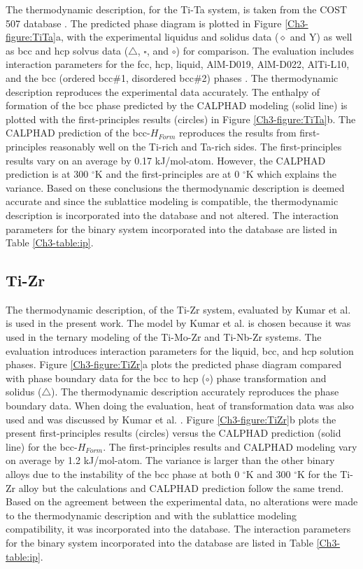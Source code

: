 The thermodynamic description, for the Ti-Ta system, is taken from the COST 507 database \cite{Ansara1998}. The predicted phase diagram is plotted in Figure \ref{Ch3-figure:TiTa}a, with the experimental liquidus and solidus data ($\diamond$ and Y) as well as bcc and hcp solvus data ($\bigtriangleup$, $\square$, and $\circ$) for comparison. The evaluation includes interaction parameters for the fcc, hcp, liquid, AlM-D019, AlM-D022, AlTi-L10, and the bcc (ordered bcc\#1, disordered bcc\#2) phases \cite{Murray1987}. The thermodynamic description reproduces the experimental data accurately. The enthalpy of formation of the bcc phase predicted by the CALPHAD modeling (solid line) is plotted with the first-principles results (circles) in Figure \ref{Ch3-figure:TiTa}b. The CALPHAD prediction of the bcc-$H_{Form}$ reproduces the results from first-principles reasonably well on the Ti-rich and Ta-rich sides. The first-principles results vary on an average by 0.17 kJ/mol-atom. However, the CALPHAD prediction is at 300 $^{\circ}$K and the first-principles are at 0 $^{\circ}$K which explains the variance. Based on these conclusions the thermodynamic description is deemed accurate and since the sublattice modeling is compatible, the thermodynamic description is incorporated into the database and not altered. The interaction parameters for the binary system incorporated into the database are listed in Table \ref{Ch3-table:ip}.

\subsection{Ti-Zr}

The thermodynamic description, of the Ti-Zr system, evaluated by Kumar et al. \cite{Kumar1994a} is used in the present work. The model by Kumar et al. is chosen because it was used in the ternary modeling of the Ti-Mo-Zr and Ti-Nb-Zr systems. The evaluation introduces interaction parameters for the liquid, bcc, and hcp solution phases. Figure \ref{Ch3-figure:TiZr}a plots the predicted phase diagram compared with phase boundary data for the bcc to hcp ($\circ$) phase transformation and solidus ($\bigtriangleup$). The thermodynamic description accurately reproduces the phase boundary data. When doing the evaluation, heat of transformation data was also used and was discussed by Kumar et al. \cite{Kumar1994a}. Figure \ref{Ch3-figure:TiZr}b plots the present first-principles results (circles) versus the CALPHAD prediction (solid line) for the bcc-$H_{Form}$. The first-principles results and CALPHAD modeling vary on average by 1.2 kJ/mol-atom. The variance is larger than the other binary alloys due to the instability of the bcc phase at both 0 $^{\circ}$K and 300 $^{\circ}$K for the Ti-Zr alloy but the calculations and CALPHAD prediction follow the same trend. Based on the agreement between the experimental data, no alterations were made to the thermodynamic description and with the sublattice modeling compatibility, it was incorporated into the database. The interaction parameters for the binary system incorporated into the database are listed in Table \ref{Ch3-table:ip}. 

